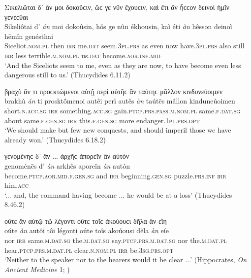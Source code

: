 \begin{exe}
\ex Σικελιῶται δ᾽ ἄν μοι δοκοῦϲιν, ὥϲ γε νῦν ἔχουϲιν, καὶ ἔτι ἂν ἧϲϲον δεινοὶ ἡμῖν γενέϲθαι\\
\gll Sikeliôtai d' \emph{án} moi dokoûsin, hṓs ge nûn ékhousin, kaì éti \emph{àn} hêsson deinoì hēmîn genésthai\\
Siceliot.\textsc{nom.pl} then \textsc{irr} me.\textsc{dat} seem.\textsc{3pl.prs} as even now have.\textsc{3pl.prs} also still \textsc{irr} less terrible.\textsc{m.nom.pl} us.\textsc{dat} become.\textsc{aor.inf.mid}\\
\trans `And the Siceliots seem to me, even as they are now, to have become even less dangerous still to us.' (Thucydides 6.11.2)
\label{multian42}
\end{exe}

\begin{exe}
\ex βραχὺ ἄν τι προϲκτώμενοι αὐτῇ περὶ αὐτῆϲ ἂν ταύτηϲ μᾶλλον κινδυνεύοιμεν\\
\gll brakhù \emph{án} ti prosktṓmenoi autêi perì autês \emph{àn} taútēs mâllon kinduneúoimen\\
short.\textsc{n.acc.sg} \textsc{irr} something.\textsc{acc.sg} gain.\textsc{ptcp.prs.pass.m.nom.pl} same.\textsc{f.dat.sg} about same.\textsc{f.gen.sg} \textsc{irr} this.\textsc{f.gen.sg} more endanger.\textsc{1pl.prs.opt}\\
\trans `We should make but few new conquests, and should imperil those we have already won.' (Thucydides 6.18.2)
\label{multian43}
\end{exe}

\begin{exe}
\ex γενομένηϲ δ᾽ ἂν ... ἀρχῆϲ ἀπορεῖν ἂν αὐτόν\\
\gll genoménēs d' \emph{àn} arkhês aporeîn \emph{àn} autón\\
become.\textsc{ptcp.aor.mid.f.gen.sg} and \textsc{irr} beginning.\textsc{gen.sg} puzzle.\textsc{prs.inf} \textsc{irr} him.\textsc{acc}\\
\trans `... and, the command having become ... he would be at a loss' (Thucydides 8.46.2)
\label{multian44}
\end{exe}

\begin{exe}
\ex οὔτε ἂν αὐτῷ τῷ λέγοντι οὔτε τοῖϲ ἀκούουϲι δῆλα ἂν εἴη\\
\gll oúte \emph{àn} autôi tôi légonti oúte toîs akoúousi dêla \emph{àn} eíē\\
nor \textsc{irr} same.\textsc{m.dat.sg} the.\textsc{m.dat.sg} say.\textsc{ptcp.prs.m.dat.sg} nor the.\textsc{m.dat.pl} hear.\textsc{ptcp.prs.m.dat.pl} clear.\textsc{n.nom.pl} \textsc{irr} be.\textsc{3sg.prs.opt}\\
\trans `Neither to the speaker nor to the hearers would it be clear ...' (Hippocrates, \textit{On Ancient Medicine} 1; \citealp[572]{Littre1839})
\label{multian45}
\end{exe}

